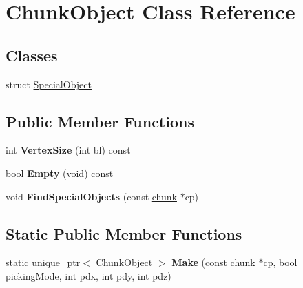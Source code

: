 \hypertarget{classChunkObject}{\section{\-Chunk\-Object \-Class \-Reference}
\label{classChunkObject}
}
\subsection*{\-Classes}
\begin{DoxyCompactItemize}
\item 
struct \hyperlink{structChunkObject_1_1SpecialObject}{\-Special\-Object}
\end{DoxyCompactItemize}
\subsection*{\-Public \-Member \-Functions}
\begin{DoxyCompactItemize}
\item 
\hypertarget{classChunkObject_a937c93c788817c34d29b689c79f13a59}{int {\bfseries \-Vertex\-Size} (int bl) const }\label{classChunkObject_a937c93c788817c34d29b689c79f13a59}

\item 
\hypertarget{classChunkObject_afaae23fe47adcde9eca46bc1237d97b7}{bool {\bfseries \-Empty} (void) const }\label{classChunkObject_afaae23fe47adcde9eca46bc1237d97b7}

\item 
\hypertarget{classChunkObject_a5ce77de941e41edae73d6c2fb696ccaf}{void {\bfseries \-Find\-Special\-Objects} (const \hyperlink{structchunk}{chunk} $\ast$cp)}\label{classChunkObject_a5ce77de941e41edae73d6c2fb696ccaf}

\end{DoxyCompactItemize}
\subsection*{\-Static \-Public \-Member \-Functions}
\begin{DoxyCompactItemize}
\item 
\hypertarget{classChunkObject_a6b4f077c0fd2c0f716f63159a187b557}{static unique\-\_\-ptr$<$ \hyperlink{classChunkObject}{\-Chunk\-Object} $>$ {\bfseries \-Make} (const \hyperlink{structchunk}{chunk} $\ast$cp, bool picking\-Mode, int pdx, int pdy, int pdz)}\label{classChunkObject_a6b4f077c0fd2c0f716f63159a187b557}

\end{DoxyCompactItemize}
